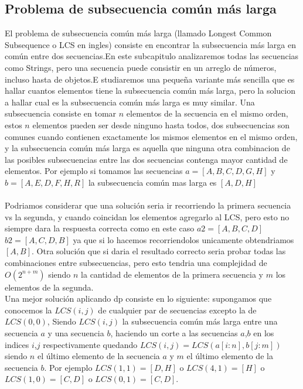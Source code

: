 \subsection{Problema de subsecuencia común más larga}
El problema de subsecuencia común más larga (llamado Longest Common Subsequence o LCS en ingles) consiste en encontrar la subsecuencia más larga en común entre dos secuencias.En este subcapitulo analizaremos todas las secuencias como Strings, pero una secuencia puede consistir en un arreglo de números, incluso hasta de objetos.E studiaremos una pequeña variante más sencilla que es hallar cuantos elementos tiene la subsecuencia común más larga, pero la solucion a hallar cual es la subsecuencia común más larga es muy similar. Una subsecuencia consiste en tomar $n$ elementos de la secuencia en el mismo orden, estos $n$ elementos pueden ser desde ninguno hasta todos, dos subsecuencias son comunes cuando contienen exactamente los mismos elementos en el mismo orden, y la subsecuencia común más larga es aquella que ninguna otra combinacion de las posibles subsecuencias entre las dos secuencias contenga mayor cantidad de elementos. Por ejemplo si tomamos las secuencias $a = [A,B,C,D,G,H]$ y $b=[A,E,D,F,H,R]$ la subsecuencia común mas larga es $[A,D,H]$
\\
\\Podriamos considerar que una solución seria ir recorriendo la primera secuencia vs la segunda, y cuando coincidan los elementos agregarlo al LCS, pero esto no siempre dara la respuesta correcta como en este caso $a2=[A,B,C,D]$ $b2=[A,C,D,B]$ ya que si lo hacemos recorriendolos unicamente obtendriamos $[A,B]$. Otra solución que si daria el resultado correcto seria probar todas las combinaciones entre subsecuencias, pero esto tendria una complejidad de $O(2^{n+m})$ siendo $n$ la cantidad de elementos de la primera secuencia y $m$ los elementos de la segunda.
\\Una mejor solución aplicando dp consiste en lo siguiente: supongamos que conocemos la $LCS(i,j)$ de cualquier par de secuencias excepto la de $LCS(0,0)$, Siendo $LCS(i,j)$ la subsecuencia común más larga entre una secuencia $a$ y una secuencia $b$, haciendo un corte a las secuencias $a$,$b$ en los indices $i$,$j$ respectivamente quedando $LCS(i,j) = LCS(a[i:n],b[j:m])$ siendo $n$ el último elemento de la secuencia $a$ y $m$ el último elemento de la secuencia $b$. Por ejemplo $LCS(1,1)=[D,H]$ o $LCS(4,1)=[H]$ o $LCS(1,0)=[C,D]$ o $LCS(0,1)=[C,D]$.
